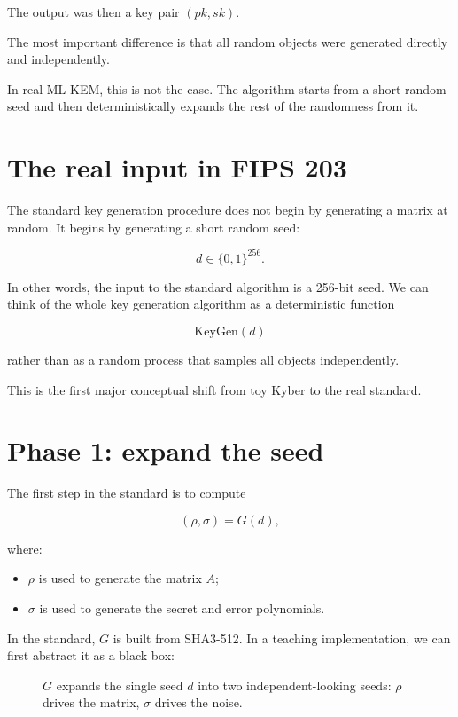 The output was then a key pair \((pk, sk)\).

The most important difference is that all random objects were generated directly and independently.

In real ML-KEM, this is not the case. The algorithm starts from a short random seed and then deterministically expands the rest of the randomness from it.

\section{The real input in FIPS 203}

The standard key generation procedure does not begin by generating a matrix at random.
It begins by generating a short random seed:

\[
d \in \{0,1\}^{256}.
\]

In other words, the input to the standard algorithm is a 256-bit seed. We can think of the whole key generation algorithm as a deterministic function

\[
\mathrm{KeyGen}(d)
\]

rather than as a random process that samples all objects independently.

This is the first major conceptual shift from toy Kyber to the real standard.

\section{Phase 1: expand the seed}

The first step in the standard is to compute

\[
(\rho, \sigma) = G(d),
\]

where:

\begin{itemize}
  \item $\rho$ is used to generate the matrix $A$;
  \item $\sigma$ is used to generate the secret and error polynomials.
\end{itemize}

In the standard, $G$ is built from SHA3-512. In a teaching implementation, we can first abstract it as a black box:

\begin{figure}[H]
\centering
{}
\caption{$G$ expands the single seed $d$ into two independent-looking seeds: $\rho$ drives the matrix, $\sigma$ drives the noise.}
\label{fig:seed-expand-g}
\end{figure}

